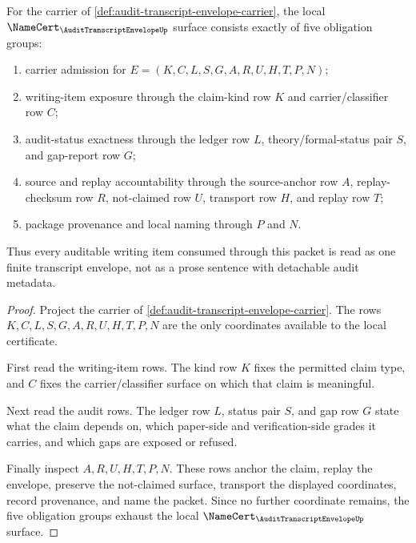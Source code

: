 \begin{theorem}
\label{thm:audit-transcript-envelope-field-coverage}
For the carrier of \autoref{def:audit-transcript-envelope-carrier}, the local $\NameCert_{\AuditTranscriptEnvelopeUp}$ surface consists exactly of five obligation groups:
\begin{enumerate}
\item carrier admission for $E=(K,C,L,S,G,A,R,U,H,T,P,N)$;
\item writing-item exposure through the claim-kind row $K$ and carrier/classifier row $C$;
\item audit-status exactness through the ledger row $L$, theory/formal-status pair $S$, and gap-report row $G$;
\item source and replay accountability through the source-anchor row $A$, replay-checksum row $R$, not-claimed row $U$, transport row $H$, and replay row $T$;
\item package provenance and local naming through $P$ and $N$.
\end{enumerate}
Thus every auditable writing item consumed through this packet is read as one finite transcript envelope, not as a prose sentence with detachable audit metadata.
\end{theorem}
\begin{proof}
Project the carrier of \autoref{def:audit-transcript-envelope-carrier}. The rows $K,C,L,S,G,A,R,U,H,T,P,N$ are the only coordinates available to the local certificate.

First read the writing-item rows. The kind row $K$ fixes the permitted claim type, and $C$ fixes the carrier/classifier surface on which that claim is meaningful.

Next read the audit rows. The ledger row $L$, status pair $S$, and gap row $G$ state what the claim depends on, which paper-side and verification-side grades it carries, and which gaps are exposed or refused.

Finally inspect $A,R,U,H,T,P,N$. These rows anchor the claim, replay the envelope, preserve the not-claimed surface, transport the displayed coordinates, record provenance, and name the packet. Since no further coordinate remains, the five obligation groups exhaust the local $\NameCert_{\AuditTranscriptEnvelopeUp}$ surface.
\end{proof}

